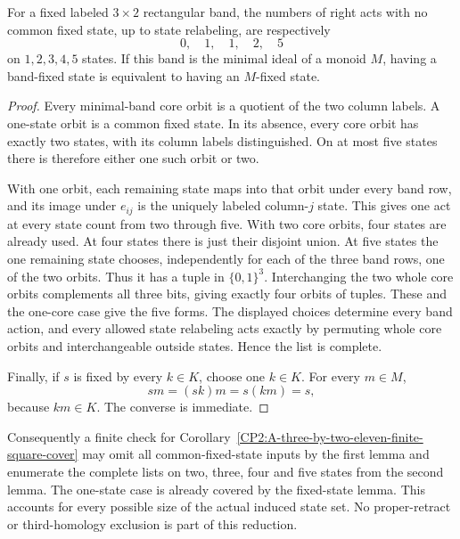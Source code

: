 \begin{lemma}
\label{CP2:A-three-by-two-small-state-band-forms}
For a fixed labeled $3\times2$ rectangular band, the
numbers of right acts with no common fixed state, up
to state relabeling, are respectively
\[
                    0,\quad1,\quad1,\quad2,\quad5
\]
on $1,2,3,4,5$ states.
If this band is the minimal ideal of a monoid $M$,
having a band-fixed state is equivalent to having
an $M$-fixed state.
\end{lemma}
\begin{proof}
Every minimal-band core orbit is a quotient of the
two column labels.  A one-state orbit is a common
fixed state.  In its absence, every core orbit has
exactly two states, with its column labels distinguished.
On at most five states there is therefore either one
such orbit or two.

With one orbit, each remaining state maps into that
orbit under every band row, and its image under
$e_{ij}$ is the uniquely labeled column-$j$ state.
This gives one act at every state count from two
through five.
With two core orbits, four states are already used.
At four states there is just their disjoint union.
At five states the one remaining state chooses,
independently for each of the three band rows, one
of the two orbits.  Thus it has a tuple in
$\{0,1\}^3$.  Interchanging the two whole core
orbits complements all three bits, giving exactly
four orbits of tuples.  These and the one-core
case give the five forms.
The displayed choices determine every band action,
and every allowed state relabeling acts exactly by
permuting whole core orbits and interchangeable
outside states.  Hence the list is complete.

Finally, if $s$ is fixed by every $k\in K$, choose
one $k\in K$.  For every $m\in M$,
\[
              sm=(sk)m=s(km)=s,
\]
because $km\in K$.  The converse is immediate.
\end{proof}

Consequently a finite check for
Corollary~\ref{CP2:A-three-by-two-eleven-finite-square-cover}
may omit all common-fixed-state inputs by the first
lemma and enumerate the complete lists on two,
three, four and five states from the second lemma.
The one-state case is already covered by the
fixed-state lemma.  This accounts for every possible
size of the actual induced state set.
No proper-retract or third-homology exclusion is
part of this reduction.
